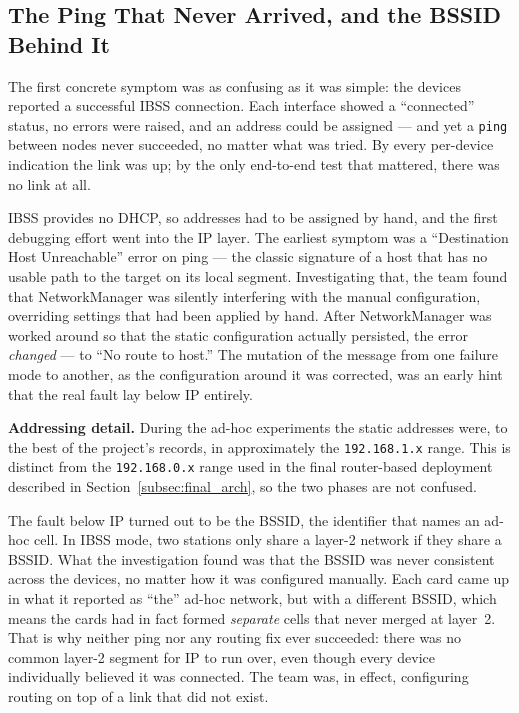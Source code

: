 \subsection{The Ping That Never Arrived, and the BSSID Behind It}
\label{subsec:bssid}

The first concrete symptom was as confusing as it was simple: the devices reported a successful IBSS connection. Each interface showed a ``connected'' status, no errors were raised, and an address could be assigned --- and yet a \texttt{ping} between nodes never succeeded, no matter what was tried. By every per-device indication the link was up; by the only end-to-end test that mattered, there was no link at all.

IBSS provides no DHCP, so addresses had to be assigned by hand, and the first debugging effort went into the IP layer. The earliest symptom was a ``Destination Host Unreachable'' error on ping --- the classic signature of a host that has no usable path to the target on its local segment. Investigating that, the team found that NetworkManager was silently interfering with the manual configuration, overriding settings that had been applied by hand. After NetworkManager was worked around so that the static configuration actually persisted, the error \emph{changed} --- to ``No route to host.'' The mutation of the message from one failure mode to another, as the configuration around it was corrected, was an early hint that the real fault lay below IP entirely.

\begin{notebox}
\textbf{Addressing detail.} During the ad-hoc experiments the static addresses were, to the best of the project's records, in approximately the \texttt{192.168.1.x} range. This is distinct from the \texttt{192.168.0.x} range used in the final router-based deployment described in Section~\ref{subsec:final_arch}, so the two phases are not confused.
\end{notebox}

The fault below IP turned out to be the BSSID, the identifier that names an ad-hoc cell. In IBSS mode, two stations only share a layer-2 network if they share a BSSID. What the investigation found was that the BSSID was never consistent across the devices, no matter how it was configured manually. Each card came up in what it reported as ``the'' ad-hoc network, but with a different BSSID, which means the cards had in fact formed \emph{separate} cells that never merged at layer~2. That is why neither ping nor any routing fix ever succeeded: there was no common layer-2 segment for IP to run over, even though every device individually believed it was connected. The team was, in effect, configuring routing on top of a link that did not exist.

